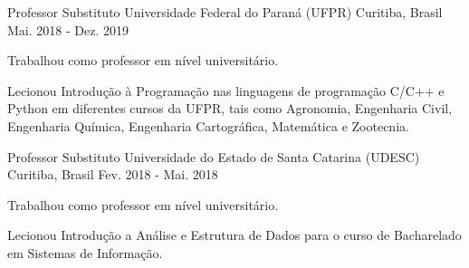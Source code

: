 

\begin{cventries}

    \cventry
	{Professor Substituto} %
	{Universidade Federal do Paraná (UFPR)} %
	{Curitiba, Brasil} %
	{Mai. 2018 - Dez. 2019} %
	{
		\begin{cvitems} %
		   \item{Trabalhou como professor em nível universitário.}
		   \item{Lecionou Introdução à Programação nas linguagens de programação C/C++ e Python em diferentes cursos da UFPR, tais como Agronomia, Engenharia Civil, Engenharia Química, Engenharia Cartográfica, Matemática e Zootecnia.}
		\end{cvitems}
	}

    \cventry
	{Professor Substituto} %
	{Universidade do Estado de Santa Catarina (UDESC)} %
	{Curitiba, Brasil} %
	{Fev. 2018 - Mai. 2018} %
	{
		\begin{cvitems} %
		   \item{Trabalhou como professor em nível universitário.}
		   \item{Lecionou Introdução a Análise e Estrutura de Dados para o curso de Bacharelado em Sistemas de Informação.}
		\end{cvitems}
	}
	

\end{cventries}
